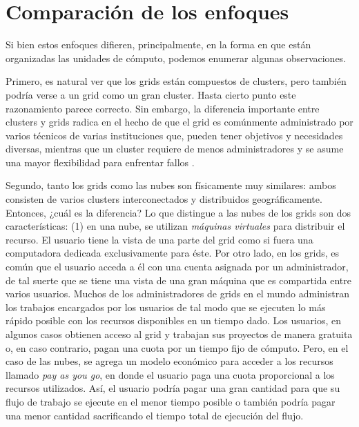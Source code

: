 \section{Comparación de los enfoques}
Si bien estos enfoques difieren, principalmente, en la forma en que están organizadas las unidades de cómputo, podemos enumerar algunas observaciones.

Primero, es natural ver que los grids están compuestos de clusters, pero también podría verse a un grid como un gran cluster. Hasta cierto punto este razonamiento parece correcto. Sin embargo, la diferencia importante entre clusters y grids radica en el hecho de que el grid es comúnmente administrado por varios técnicos de varias instituciones que, pueden tener objetivos y necesidades diversas, mientras que un cluster requiere de menos administradores y se asume una mayor flexibilidad para enfrentar fallos \cite{buyya2009cloud}. %

Segundo, tanto los grids como las nubes son físicamente muy similares: ambos consisten de varios clusters interconectados y distribuidos geográficamente. Entonces, ¿cuál es la diferencia? Lo que distingue a las nubes de los grids son dos características: (1) en una nube, se utilizan \emph{máquinas virtuales} para distribuir el recurso. El usuario tiene la vista de una parte del grid como si fuera una computadora dedicada exclusivamente para éste. Por otro lado, en los grids, es común que el usuario acceda a él con una cuenta asignada por un administrador, de tal suerte que se tiene una vista de una gran máquina que es compartida entre varios usuarios. Muchos de los administradores de grids en el mundo administran los trabajos encargados por los usuarios de tal modo que se ejecuten lo más rápido posible con los recursos disponibles en un tiempo dado. Los usuarios, en algunos casos obtienen acceso al grid y trabajan sus proyectos de manera gratuita o, en caso contrario, pagan una cuota por un tiempo fijo de cómputo. Pero, en el caso de las nubes, se agrega un modelo económico para acceder a los recursos llamado \emph{pay as you go}, en donde el usuario paga una cuota proporcional a los recursos utilizados. Así, el usuario podría pagar una gran cantidad para que su flujo de trabajo se ejecute en el menor tiempo posible o también podría pagar una menor cantidad sacrificando el tiempo total de ejecución del flujo.